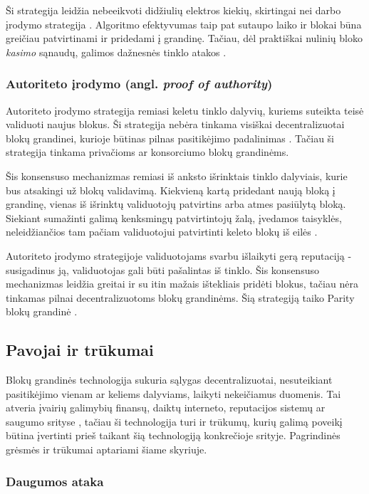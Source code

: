 Ši strategija leidžia nebeeikvoti didžiulių elektros kiekių, skirtingai nei darbo įrodymo strategija \cite{Ethereum}. Algoritmo efektyvumas
taip pat sutaupo laiko ir blokai būna greičiau patvirtinami ir pridedami į grandinę. Tačiau, dėl praktiškai nulinių bloko \textit{kasimo} sąnaudų,
galimos dažnesnės tinklo atakos \cite{Zheng2017}. 

\subsubsection{Autoriteto įrodymo (angl. \textit{proof of authority})}

Autoriteto įrodymo strategija remiasi keletu tinklo dalyvių, kuriems suteikta teisė validuoti naujus blokus. Ši strategija nebėra tinkama visiškai
decentralizuotai blokų grandinei, kurioje būtinas pilnas pasitikėjimo padalinimas \cite{ProofOfAuthority}. Tačiau ši strategija tinkama privačioms
ar konsorciumo blokų grandinėms.

Šis konsensuso mechanizmas remiasi iš anksto išrinktais tinklo dalyviais, kurie bus atsakingi už blokų validavimą. Kiekvieną kartą pridedant naują
bloką į grandinę, vienas iš išrinktų validuotojų patvirtins arba atmes pasiūlytą bloką. Siekiant sumažinti galimą kenksmingų patvirtintojų žalą,
įvedamos taisyklės, neleidžiančios tam pačiam validuotojui patvirtinti keleto blokų iš eilės \cite{ProofOfAuthority}.

Autoriteto įrodymo strategijoje validuotojams svarbu išlaikyti gerą reputaciją - susigadinus ją, validuotojas gali būti pašalintas iš tinklo. Šis konsensuso mechanizmas
leidžia greitai ir su itin mažais ištekliais pridėti blokus, tačiau nėra tinkamas pilnai decentralizuotoms blokų grandinėms. Šią strategiją
taiko Parity blokų grandinė \cite{ProofOfAuthority}.

\subsection{Pavojai ir trūkumai}

Blokų grandinės technologija sukuria sąlygas decentralizuotai, nesuteikiant pasitikėjimo vienam ar keliems dalyviams, laikyti nekeičiamus duomenis.
Tai atveria įvairių galimybių finansų, daiktų interneto, reputacijos sistemų ar saugumo srityse \cite{Zheng2017}, tačiau ši technologija turi ir trūkumų,
kurių galimą poveikį būtina įvertinti prieš taikant šią technologiją konkrečioje srityje. Pagrindinės grėsmės ir trūkumai aptariami šiame skyriuje.

\subsubsection{Daugumos ataka}

